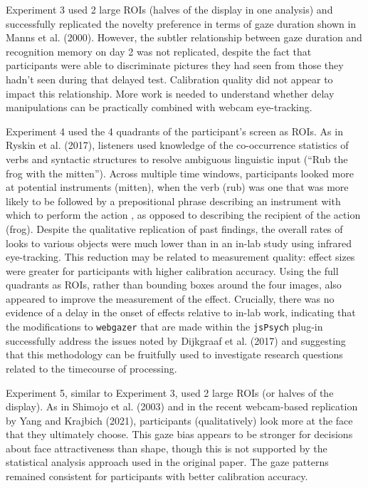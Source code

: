 \documentclass[
  man,floatsintext]{apa6}
\begin{document}
Experiment 3 used 2 large ROIs (halves of the display in one analysis) and successfully replicated the novelty preference in terms of gaze duration shown in Manns et al. (2000). However, the subtler relationship between gaze duration and recognition memory on day 2 was not replicated, despite the fact that participants were able to discriminate pictures they had seen from those they hadn't seen during that delayed test. Calibration quality did not appear to impact this relationship. More work is needed to understand whether delay manipulations can be practically combined with webcam eye-tracking.

Experiment 4 used the 4 quadrants of the participant's screen as ROIs. As in Ryskin et al. (2017), listeners used knowledge of the co-occurrence statistics of verbs and syntactic structures to resolve ambiguous linguistic input (``Rub the frog with the mitten''). Across multiple time windows, participants looked more at potential instruments (mitten), when the verb (rub) was one that was more likely to be followed by a prepositional phrase describing an instrument with which to perform the action , as opposed to describing the recipient of the action (frog). Despite the qualitative replication of past findings, the overall rates of looks to various objects were much lower than in an in-lab study using infrared eye-tracking. This reduction may be related to measurement quality: effect sizes were greater for participants with higher calibration accuracy. Using the full quadrants as ROIs, rather than bounding boxes around the four images, also appeared to improve the measurement of the effect. Crucially, there was no evidence of a delay in the onset of effects relative to in-lab work, indicating that the modifications to \texttt{webgazer} that are made within the \texttt{jsPsych} plug-in successfully address the issues noted by Dijkgraaf et al. (2017) and suggesting that this methodology can be fruitfully used to investigate research questions related to the timecourse of processing.

Experiment 5, similar to Experiment 3, used 2 large ROIs (or halves of the display). As in Shimojo et al. (2003) and in the recent webcam-based replication by Yang and Krajbich (2021), participants (qualitatively) look more at the face that they ultimately choose. This gaze bias appears to be stronger for decisions about face attractiveness than shape, though this is not supported by the statistical analysis approach used in the original paper. The gaze patterns remained consistent for participants with better calibration accuracy.
\end{document}
